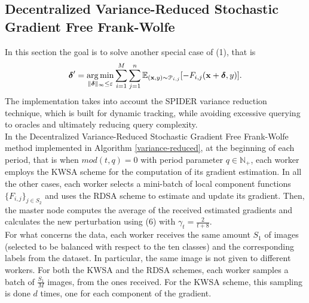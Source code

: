 \subsection{Decentralized Variance-Reduced Stochastic Gradient Free Frank-Wolfe}
In this section the goal is to solve another special case of (1), that is
\begin{equation}
	\mbox{\boldmath$ \delta$}' = \operatorname*{arg\,min}_{\lVert \mbox{\boldmath$\scriptstyle \delta$}\rVert_{\infty}\leq\varepsilon} \sum_{i=1}^M \sum_{j=1}^n \mathbb{E}_{(\mathbf{x},y)\sim \mathcal{P}_{i,j}}[- F_{i,j}(\mathbf{x}+\mbox{\boldmath$ \delta$},y)].
\end{equation}
The implementation takes into account the SPIDER variance reduction technique, which is built for dynamic tracking, while avoiding excessive querying to oracles and ultimately reducing query complexity.\\
\indent In the Decentralized Variance-Reduced Stochastic Gradient Free Frank-Wolfe method implemented in Algorithm \ref{variance-reduced},
at the beginning of each period, that is when $mod(t,q)=0$ with period parameter $q \in \mathbb{N}_{+}$, each worker employs the KWSA scheme for the computation of its gradient estimation. In all the other cases, each worker selects a mini-batch of local component functions $\{F_{i,j}\}_{j\in S_2}$ and uses the RDSA scheme to estimate and update its gradient. Then, the master node computes the average of the received estimated gradients and calculates the new perturbation using (6) with $\gamma_t = \frac{2}{t+8}$.\\
\indent For what concerns the data, each worker receives the same amount $S_1$ of images (selected to be balanced with respect to the ten classes) and the corresponding labels from the dataset. In particular, the same image is not given to different workers. For both the KWSA and the RDSA schemes, each worker samples a batch of $\frac{S_1}{M}$ images, from the ones received. For the KWSA scheme, this sampling is done $d$ times, one for each component of the gradient.  
